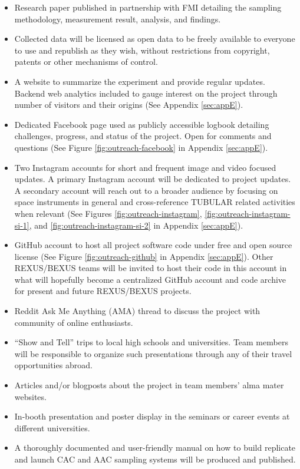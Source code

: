 \documentclass[a4paper,12pt,twoside]{article}
\begin{document}
\begin{itemize}
\item Research paper published in partnership with FMI detailing the sampling methodology, measurement result, analysis, and findings.
\item Collected data will be licensed as open data to be freely available to everyone to use and republish as they wish, without restrictions from copyright, patents or other mechanisms of control.
\item A website to summarize the experiment and provide regular updates. Backend web analytics included to gauge interest on the project through number of visitors and their origins (See Appendix \ref{sec:appE}).
\item Dedicated Facebook page used as publicly accessible logbook detailing challenges, progress, and status of the project. Open for comments and questions (See Figure \ref{fig:outreach-facebook} in Appendix \ref{sec:appE}).
\item Two Instagram accounts for short and frequent image and video focused updates. A primary Instagram account will be dedicated to project updates. A secondary account will reach out to a broader audience by focusing on space instruments in general and cross-reference TUBULAR related activities when relevant (See Figures \ref{fig:outreach-instagram}, \ref{fig:outreach-instagram-si-1}, and \ref{fig:outreach-instagram-si-2} in Appendix \ref{sec:appE}).
\item GitHub account to host all project software code under free and open source license (See Figure \ref{fig:outreach-github} in Appendix \ref{sec:appE}). Other REXUS/BEXUS teams will be invited to host their code in this account in what will hopefully become a centralized GitHub account and code archive for present and future REXUS/BEXUS projects.
\item Reddit Ask Me Anything (AMA) thread to discuss the project with community of online enthusiasts.
\item\enquote{Show and Tell} trips to local high schools and universities. Team members will be responsible to organize such presentations through any of their travel opportunities abroad.
\item Articles and/or blogposts about the project in team members' alma mater websites.
\item In-booth presentation and poster display in the seminars or career events at different universities. 
\item A thoroughly documented and user-friendly manual on how to build replicate and launch CAC and AAC sampling systems will be produced and published.
\end{itemize}
\pagebreak
\end{document}
